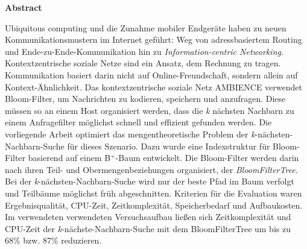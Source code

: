 %
%
\vspace*{2cm}

\begin{center}
    \textbf{Abstract}
\end{center}

\vspace*{1cm}

\noindent Ubiquitous computing und die Zunahme mobiler Endgeräte haben zu neuen Kommunikationsmustern im Internet geführt: Weg von adressbasiertem Routing und Ende-zu-Ende-Kommunikation hin zu \textit{Information-centric Networking}. Kontextzentrische soziale Netze sind ein Ansatz, dem Rechnung zu tragen. Kommunikation basiert darin nicht auf Online-Freundschaft, sondern allein auf Kontext-Ähnlichkeit. Das kontextzentrische soziale Netz AMBIENCE verwendet Bloom-Filter, um Nachrichten zu kodieren, speichern und anzufragen. Diese müssen so an einem Host organisiert werden, dass die \textit{k} nächsten Nachbarn zu einem Anfragefilter möglichst schnell und effizient gefunden werden. Die vorliegende Arbeit optimiert das mengentheoretische Problem der \textit{k}-nächsten-Nachbarn-Suche für dieses Szenario. Dazu wurde eine Indexstruktur für Bloom-Filter basierend auf einem B$^+$-Baum entwickelt. Die Bloom-Filter werden darin nach ihren Teil- und Obermengenbeziehungen organisiert, der \textit{BloomFilterTree}. Bei der \textit{k}-nächsten-Nachbarn-Suche wird nur der beste Pfad im Baum verfolgt und Teilbäume möglichst früh abgeschnitten. Kriterien für die Evaluation waren Ergebnisqualität, CPU-Zeit, Zeitkomplexität, Speicherbedarf und Aufbaukosten. Im verwendeten verwendeten Versuchsaufbau ließen sich Zeitkomplexität und CPU-Zeit der \textit{k}-nächste-Nachbarn-Suche mit dem BloomFilterTree um bis zu 68\% bzw. 87\% reduzieren. 